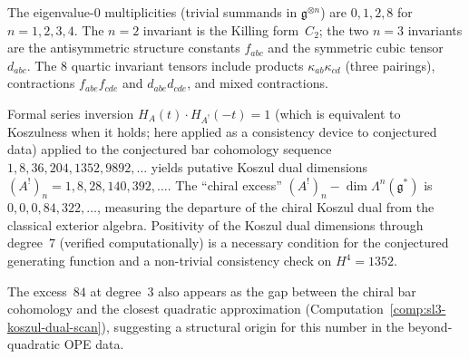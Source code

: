 \begin{computation}
The eigenvalue-$0$ multiplicities (trivial summands in $\mathfrak{g}^{\otimes n}$)
are $0, 1, 2, 8$ for $n = 1, 2, 3, 4$.  The $n=2$ invariant is the
Killing form~$C_2$; the two $n=3$ invariants are the antisymmetric
structure constants $f_{abc}$ and the symmetric cubic tensor $d_{abc}$.
The $8$ quartic invariant tensors include products $\kappa_{ab}\kappa_{cd}$
(three pairings), contractions $f_{abe}f_{cde}$ and $d_{abe}d_{cde}$,
and mixed contractions.
\end{computation}

\begin{remark}
\label{rem:sl3-koszul-dual}

Formal series inversion $H_A(t) \cdot H_{A^!}(-t) = 1$
(which is equivalent to Koszulness when it holds; here applied as a
consistency device to conjectured data) applied to the
conjectured bar cohomology sequence $1, 8, 36, 204, 1352, 9892, \ldots$
yields putative Koszul dual dimensions
$(A^!)_n = 1, 8, 28, 140, 392, \ldots$.
The ``chiral excess'' $(A^!)_n - \dim \Lambda^n(\mathfrak{g}^*)$ is
$0, 0, 0, 84, 322, \ldots$, measuring the departure of the chiral
Koszul dual from the classical exterior algebra.  Positivity of the
Koszul dual dimensions through degree~$7$ (verified computationally)
is a necessary condition for the conjectured generating function
and a non-trivial consistency check on $H^4 = 1352$.

The excess~$84$ at degree~$3$ also appears as the gap between the
chiral bar cohomology and the closest quadratic approximation
(Computation~\ref{comp:sl3-koszul-dual-scan}), suggesting a
structural origin for this number in the beyond-quadratic
OPE data.
\end{remark}


